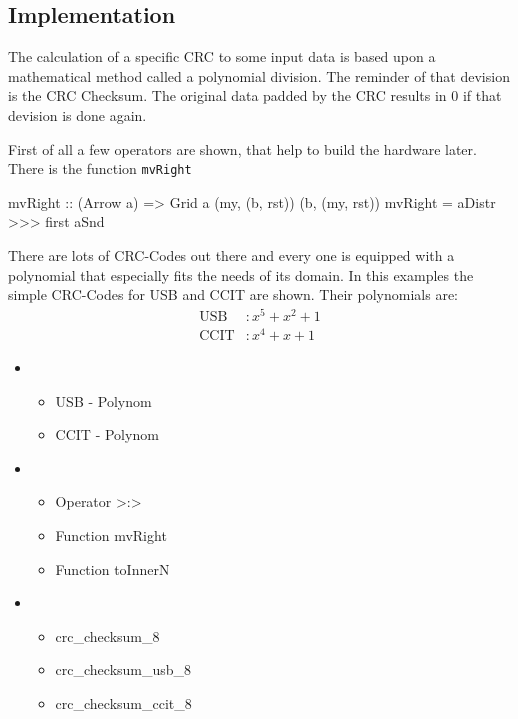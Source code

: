 \documentclass[9pt,final,a4paper,leqno]{article}
\newcommand{\hs}[1]{\mbox{\lstinline[basicstyle=\color{textgray}]!#1!}}
\begin{document}
\subsection{Implementation}
The calculation of a specific CRC to some input data is based upon a mathematical method called a polynomial division. The reminder of that
devision is the CRC Checksum. The original data padded by the CRC results in 0 if that devision is done again. 

\par
First of all a few operators are shown, that help to build the hardware later. There is the function \hs{mvRight} 

\begin{haskell}
mvRight :: (Arrow a) => Grid a (my, (b, rst)) (b, (my, rst))
mvRight 
  =   aDistr
  >>> first aSnd
\end{haskell} 


\par 
There are lots of CRC-Codes out there and every one is equipped with a polynomial that especially fits the needs of its domain. In this
examples the simple CRC-Codes for USB and CCIT are shown. Their polynomials are:
\begin{align*}
  \text{USB} &: x^5 + x^2 + 1 \\
  \text{CCIT}&: x^4 + x   + 1 
\end{align*}



\begin{itemize}
  \item 
    \begin{itemize}
      \item USB  - Polynom
      \item CCIT - Polynom
    \end{itemize}

  \item 
    \begin{itemize}
      \item Operator >:>
      \item Function mvRight
      \item Function toInnerN
    \end{itemize}

  \item
    \begin{itemize}
      \item crc\_checksum\_8
      \item crc\_checksum\_usb\_8
      \item crc\_checksum\_ccit\_8
    \end{itemize}
    
\end{itemize}
\end{document}

